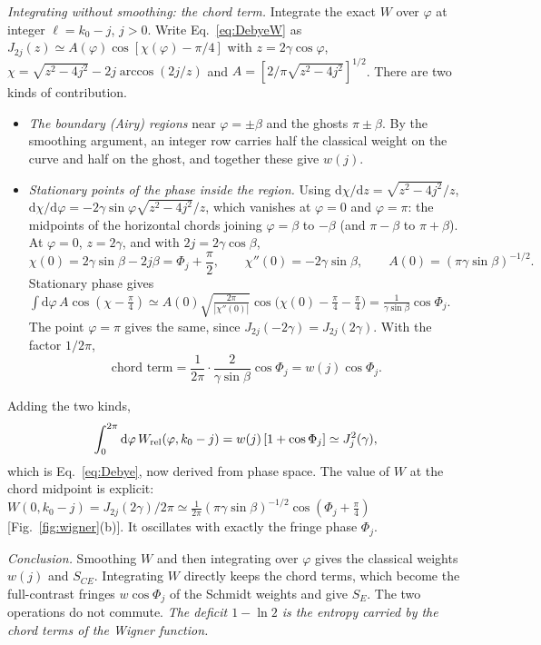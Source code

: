 \documentclass[aps,pra,onecolumn,notitlepage,nofootinbib,11pt]{revtex4-2}
\newcommand{\dd}{\mathrm{d}}
\begin{document}
\emph{Integrating without smoothing: the chord term.} Integrate the exact $W$ over
$\varphi$ at integer $\ell=k_{0}-j$, $j>0$. Write Eq.~\eqref{eq:DebyeW} as
$J_{2j}(z)\simeq A(\varphi)\cos[\chi(\varphi)-\pi/4]$ with $z=2\gamma\cos\varphi$,
$\chi=\sqrt{z^{2}-4j^{2}}-2j\arccos(2j/z)$ and $A=[2/\pi\sqrt{z^{2}-4j^{2}}]^{1/2}$.
There are two kinds of contribution.
\begin{itemize}
\item \emph{The boundary (Airy) regions} near $\varphi=\pm\beta$ and the ghosts $\pi\pm\beta$. By
the smoothing argument, an integer row carries half the classical weight on the curve
and half on the ghost, and together these give $w(j)$.
\item \emph{Stationary points of the phase inside the region.} Using
$\dd\chi/\dd z=\sqrt{z^{2}-4j^{2}}/z$, $\dd\chi/\dd\varphi=-2\gamma\sin\varphi\sqrt{z^{2}-4j^{2}}/z$,
which vanishes at $\varphi=0$ and $\varphi=\pi$: the midpoints of the horizontal chords joining
$\varphi=\beta$ to $-\beta$ (and $\pi-\beta$ to $\pi+\beta$). At $\varphi=0$, $z=2\gamma$, and with
$2j=2\gamma\cos\beta$,
\begin{equation}
\chi(0)=2\gamma\sin\beta-2j\beta=\Phi_{j}+\frac{\pi}{2},\qquad
\chi''(0)=-2\gamma\sin\beta,\qquad A(0)=(\pi\gamma\sin\beta)^{-1/2}.
\end{equation}
Stationary phase gives
$\int\dd\varphi\,A\cos(\chi-\frac\pi4)\simeq A(0)\sqrt{\frac{2\pi}{|\chi''(0)|}}\cos\big(\chi(0)-\frac\pi4-\frac\pi4\big)
=\frac{1}{\gamma\sin\beta}\cos\Phi_{j}$. The point $\varphi=\pi$ gives the same, since
$J_{2j}(-2\gamma)=J_{2j}(2\gamma)$. With the factor $1/2\pi$,
\begin{equation}
\text{chord term}=\frac{1}{2\pi}\cdot\frac{2}{\gamma\sin\beta}\cos\Phi_{j}=w(j)\cos\Phi_{j}.
\end{equation}
\end{itemize}
Adding the two kinds,
\begin{equation}
\int_{0}^{2\pi}\dd\varphi\,W_{\rm rel}(\varphi,k_{0}-j)=w(j)\left[1+\cos\Phi_{j}\right]\simeq J_{j}^{2}(\gamma),
\end{equation}
which is Eq.~\eqref{eq:Debye}, now derived from phase space. The value of $W$ at the chord
midpoint is explicit: $W(0,k_{0}-j)=J_{2j}(2\gamma)/2\pi\simeq\frac{1}{2\pi}(\pi\gamma\sin\beta)^{-1/2}
\cos(\Phi_{j}+\frac\pi4)$ [Fig.~\ref{fig:wigner}(b)]. It oscillates with exactly the fringe
phase $\Phi_{j}$.

\emph{Conclusion.} Smoothing $W$ and then integrating over $\varphi$ gives the classical
weights $w(j)$ and $S_{CE}$. Integrating $W$ directly keeps the chord terms, which become the
full-contrast fringes $w\cos\Phi_{j}$ of the Schmidt weights and give $S_{E}$. The two
operations do not commute. \emph{The deficit $1-\ln2$ is the entropy carried by the chord
terms of the Wigner function.}
\end{document}
